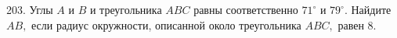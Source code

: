 203. Углы $A$ и $B$ и треугольника $ABC$ равны соответственно $71^\circ$ и $79^\circ.$ Найдите $AB,$ если радиус окружности, описанной около треугольника $ABC,$ равен 8.\\
